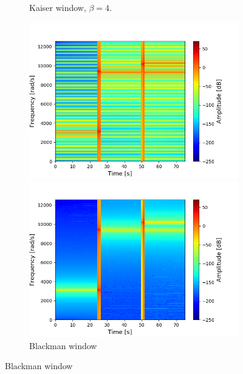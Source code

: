 \begin{figure}[H]
\begin{subfigure}{0.49\textwidth}
\caption{Kaiser window, $\beta=4$.}
\label{fig:stft_kaiser_10000_4}
\end{subfigure}
\centering
\begin{subfigure}{0.49\textwidth}
\centering

\includegraphics[width=\textwidth]{figures/stft_windows/bartlett_10000.png}
\caption{Bartlett window}
\label{fig:stft_bartlett}
\includegraphics[width=\textwidth]{figures/stft_windows/blackman_10000.png}
\caption{Blackman window}
\label{fig:stft_blackman}

\end{subfigure}
\end{figure}
